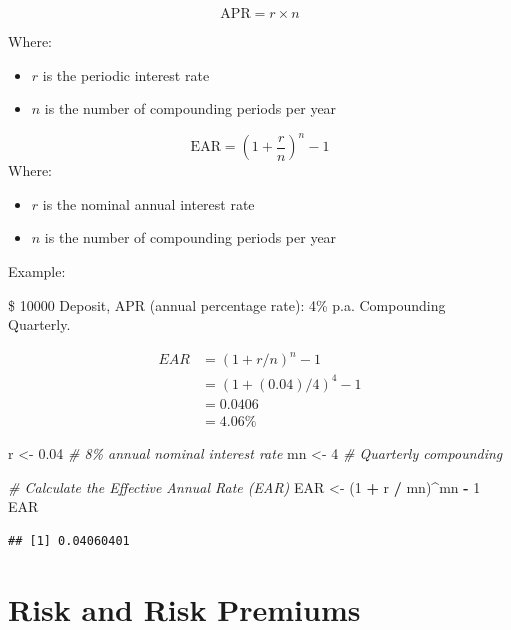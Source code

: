\documentclass[
]{book}
\newenvironment{Shaded}{\begin{snugshade}}{\end{snugshade}}
\newcommand{\CommentTok}[1]{\textcolor[rgb]{0.56,0.35,0.01}{\textit{#1}}}
\newcommand{\DecValTok}[1]{\textcolor[rgb]{0.00,0.00,0.81}{#1}}
\newcommand{\FloatTok}[1]{\textcolor[rgb]{0.00,0.00,0.81}{#1}}
\newcommand{\NormalTok}[1]{#1}
\newcommand{\OtherTok}[1]{\textcolor[rgb]{0.56,0.35,0.01}{#1}}
\newcommand{\SpecialCharTok}[1]{\textcolor[rgb]{0.81,0.36,0.00}{\textbf{#1}}}
\providecommand{\tightlist}{%
  \setlength{\itemsep}{0pt}\setlength{\parskip}{0pt}}
\begin{document}
\[
\text{APR} = r \times n
\]

Where:

\begin{itemize}
\tightlist
\item
  \(r\) is the periodic interest rate
\item
  \(n\) is the number of compounding periods per year
\end{itemize}

\[
\text{EAR} = \left(1 + \frac{r}{n}\right)^n - 1
\] Where:

\begin{itemize}
\tightlist
\item
  \(r\) is the nominal annual interest rate
\item
  \(n\) is the number of compounding periods per year
\end{itemize}

Example:

\$ 10000 Deposit, APR (annual percentage rate): 4\% p.a. Compounding
Quarterly.

\[ 
\begin{aligned}
EAR &= (1+r/n)^n− 1 \\
&=(1+(0.04)/4)^4 −1 \\
&=0.0406 \\
&= 4.06\% 
\end{aligned}
\]

\begin{Shaded}
\begin{Highlighting}[]
\NormalTok{r }\OtherTok{\textless{}{-}} \FloatTok{0.04}  \CommentTok{\# 8\% annual nominal interest rate}
\NormalTok{mn }\OtherTok{\textless{}{-}} \DecValTok{4}  \CommentTok{\# Quarterly compounding}

\CommentTok{\# Calculate the Effective Annual Rate (EAR)}
\NormalTok{EAR }\OtherTok{\textless{}{-}}\NormalTok{ (}\DecValTok{1} \SpecialCharTok{+}\NormalTok{ r }\SpecialCharTok{/}\NormalTok{ mn)}\SpecialCharTok{\^{}}\NormalTok{mn }\SpecialCharTok{{-}} \DecValTok{1}
\NormalTok{EAR}
\end{Highlighting}
\end{Shaded}

\begin{verbatim}
## [1] 0.04060401
\end{verbatim}

\hypertarget{risk-and-risk-premiums}{%
\section{Risk and Risk Premiums}\label{risk-and-risk-premiums}}
\end{document}
